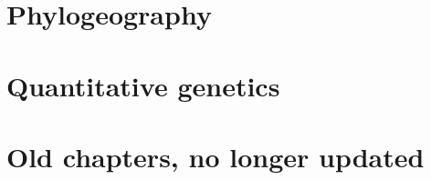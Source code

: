 \documentclass[12pt,titlepage,openright]{book}
\begin{document}




\part{Phylogeography}






\part{Quantitative genetics}








\part{Old chapters, no longer updated}




























\printindex
\end{document}
